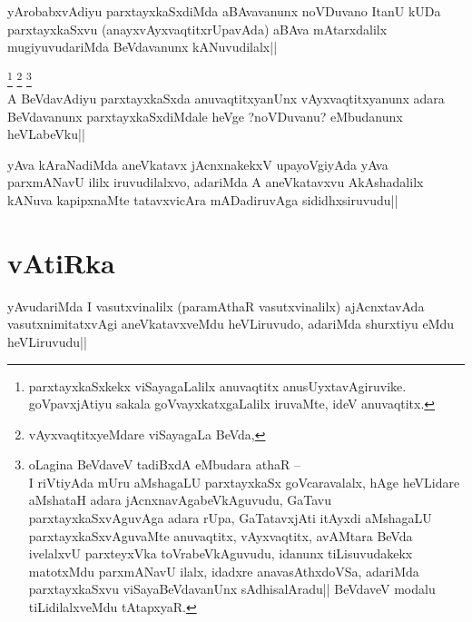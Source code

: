 
\begin{artha} 
yArobabxvAdiyu parxtayxkaSxdiMda aBAvavanunx noVDuvano ItanU kUDa 
parxtayxkaSxvu (anayxvAyxvaqtitxrUpavAda) aBAva mAtarxdalilx 
mugiyuvudariMda BeVdavanunx kANuvudilalx||
\end{artha}


\begin{artha}
\footnote[1]{parxtayxkaSxkekx viSayagaLalilx anuvaqtitx 
anusUyxtavAgiruvike. goVpavxjAtiyu sakala goVvayxkatxgaLalilx 
iruvaMte, ideV anuvaqtitx.}
\footnote[2]{vAyxvaqtitxyeMdare viSayagaLa BeVda,}
\footnote[3]{oLagina BeVdaveV tadiBxdA eMbudara athaR --\\ I riVtiyAda 
mUru aMshagaLU parxtayxkaSx goVcaravalalx, hAge heVLidare aMshataH 
adara jAcnxnavAgabeVkAguvudu, GaTavu parxtayxkaSxvAguvAga adara rUpa, 
GaTatavxjAti itAyxdi aMshagaLU parxtayxkaSxvAguvaMte anuvaqtitx, 
vAyxvaqtitx, avAMtara BeVda ivelalxvU parxteyxVka toVrabeVkAguvudu, 
idanunx tiLisuvudakekx matotxMdu parxmANavU ilalx, idadxre 
anavasAthxdoVSa, adariMda parxtayxkaSxvu viSayaBeVdavanUnx 
sAdhisalAradu|| BeVdaveV modalu tiLidilalxveMdu tAtapxyaR.}\\
A BeVdavAdiyu parxtayxkaSxda anuvaqtitxyanUnx vAyxvaqtitxyanunx adara 
BeVdavanunx parxtayxkaSxdiMdale heVge ?noVDuvanu? eMbudanunx 
heVLabeVku||
\end{artha}


\begin{artha} 
yAva kAraNadiMda aneVkatavx jAcnxnakekxV upayoVgiyAda yAva parxmANavU 
ililx iruvudilalxvo, adariMda A aneVkatavxvu AkAshadalilx kANuva 
kapipxnaMte tatavxvicAra mADadiruvAga sididhxsiruvudu||
\end{artha}

\section*{vAtiRka}

\begin{artha} 
yAvudariMda I vasutxvinalilx (paramAthaR vasutxvinalilx) ajAcnxtavAda 
vasutxnimitatxvAgi aneVkatavxveMdu heVLiruvudo, adariMda shurxtiyu 
\stext eMdu heVLiruvudu||
\end{artha}

